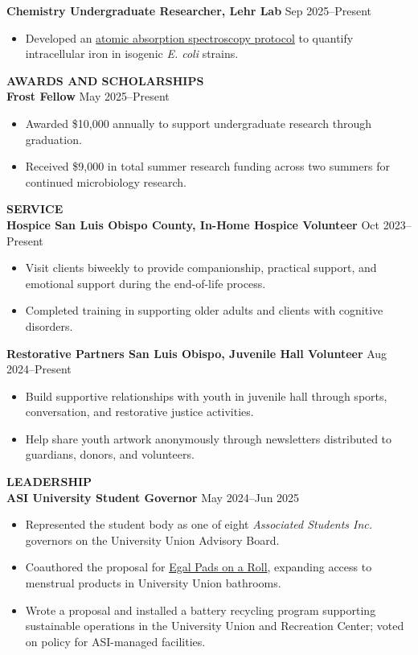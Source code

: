 \documentclass[10pt]{article}
\begin{document}
\textbf{Chemistry Undergraduate Researcher, Lehr Lab}
\hfill
Sep 2025--Present
\begin{itemize}
  \item Developed an \href{https://jinsko.com/research/ironQuant.html}{atomic absorption spectroscopy protocol} to quantify intracellular iron in isogenic \textit{E. coli} strains.
\end{itemize}

\textbf{AWARDS AND SCHOLARSHIPS}
\hrulefill\\
\textbf{Frost Fellow}
\hfill
May 2025--Present
\begin{itemize}
  \item Awarded \$10,000 annually to support undergraduate research through graduation.
  \item Received \$9,000 in total summer research funding across two summers for continued microbiology research.
\end{itemize}

\textbf{SERVICE}
\hrulefill\\
\textbf{Hospice San Luis Obispo County, In-Home Hospice Volunteer}
\hfill
Oct 2023--Present
\begin{itemize}
  \item Visit clients biweekly to provide companionship, practical support, and emotional support during the end-of-life process.
  \item Completed training in supporting older adults and clients with cognitive disorders.
\end{itemize}

\textbf{Restorative Partners San Luis Obispo, Juvenile Hall Volunteer}
\hfill
Aug 2024--Present
\begin{itemize}
  \item Build supportive relationships with youth in juvenile hall through sports, conversation, and restorative justice activities.
  \item Help share youth artwork anonymously through newsletters distributed to guardians, donors, and volunteers.
\end{itemize}

\textbf{LEADERSHIP}
\hrulefill\\
\textbf{ASI University Student Governor}
\hfill
May 2024--Jun 2025
\begin{itemize}
  \item Represented the student body as one of eight \textit{Associated Students Inc.} governors on the University Union Advisory Board.
  \item Coauthored the proposal for \href{https://mustangnews.net/asi-installs-egal-pads-on-a-roll/}{Egal Pads on a Roll}, expanding access to menstrual products in University Union bathrooms.
  \item Wrote a proposal and installed a battery recycling program supporting sustainable operations in the University Union and Recreation Center; voted on policy for ASI-managed facilities.
\end{itemize}
\end{document}
